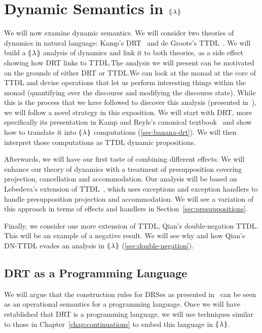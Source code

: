 \chapter{Dynamic Semantics in \texorpdfstring{$\llparenthesis \, \lambda \, \rrparenthesis$}{Our Calculus}}
\label{chap:dynamic-semantics}

We will now examine dynamic semantics. We will consider two theories of
dynamics in natural language: Kamp's DRT~\cite{kamp1993discourse} and de
Groote's TTDL~\cite{de2006towards}. We will build a $\llparenthesis \, \lambda \, \rrparenthesis$
analysis of dynamics and link it to both theories, as a side effect showing
how DRT links to TTDL.\@ The analysis we will present can be motivated on
the grounds of either DRT or TTDL.\@ We can look at the monad at the core
of TTDL and devise operations that let us perform interesting things within
the monad (quantifying over the discourse and modifying the discourse
state). While this is the process that we have followed to discover this
analysis (presented in~\cite{marsik2014algebraic}), we will follow a novel
strategy in this exposition. We will start with DRT, more specifically its
presentation in Kamp and Reyle's canonical
textbook~\cite{kamp1993discourse} and show how to translate it into
$\llparenthesis \, \lambda \, \rrparenthesis$ computations (\ref{sec:banana-drt}). We will then
interpret those computations as TTDL dynamic propositions.

Afterwards, we will have our first taste of combining different effects. We
will enhance our theory of dynamics with a treatment of presupposition
covering projection, cancellation and accommodation. Our analysis will be
based on Lebedeva's extension of TTDL~\cite{lebedeva2012expression}, which
uses exceptions and exception handlers to handle presupposition projection
and accommodation. We will see a variation of this approach in terms of
effects and handlers in Section~\ref{sec:presuppositions}.

Finally, we consider one more extension of TTDL, Qian's double-negation
TTDL. This will be an example of a negative result. We will see why and how
Qian's DN-TTDL evades an analysis in ${\llparenthesis \, \lambda \, \rrparenthesis}$ (\ref{sec:double-negation}).

\minitoc


\section{DRT as a Programming Language}
\label{sec:drt-as-pl}

We will argue that the construction rules for DRSes as presented
in~\cite{kamp1993discourse} can be seen as an operational semantics for a
programming language. Once we will have established that DRT is a
programming language, we will use techniques similar to those in
Chapter~\ref{chap:continuations} to embed this language in
$\llparenthesis \, \lambda \, \rrparenthesis$.

